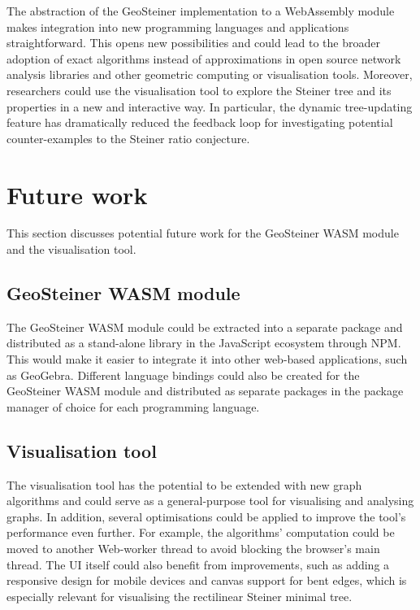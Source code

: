 \documentclass{l4proj}
\begin{document}
The abstraction of the GeoSteiner implementation to a WebAssembly module makes integration into new programming languages and applications straightforward. This opens new possibilities and could lead to the broader adoption of exact algorithms instead of approximations in open source network analysis libraries and other geometric computing or visualisation tools.
Moreover, researchers could use the visualisation tool to explore the Steiner tree and its properties in a new and interactive way. In particular, the dynamic tree-updating feature has dramatically reduced the feedback loop for investigating potential counter-examples to the Steiner ratio conjecture.

\section{Future work}
This section discusses potential future work for the GeoSteiner WASM module and the visualisation tool.

\subsection{GeoSteiner WASM module}
The GeoSteiner WASM module could be extracted into a separate package and distributed as a stand-alone library in the JavaScript ecosystem through NPM. This would make it easier to integrate it into other web-based applications, such as GeoGebra. Different language bindings could also be created for the GeoSteiner WASM module and distributed as separate packages in the package manager of choice for each programming language.

\subsection{Visualisation tool}
The visualisation tool has the potential to be extended with new graph algorithms and could serve as a general-purpose tool for visualising and analysing graphs.
In addition, several optimisations could be applied to improve the tool's performance even further. For example, the algorithms' computation could be moved to another Web-worker thread to avoid blocking the browser's main thread.
The UI itself could also benefit from improvements, such as adding a responsive design for mobile devices and canvas support for bent edges, which is especially relevant for visualising the rectilinear Steiner minimal tree.
\end{document}
